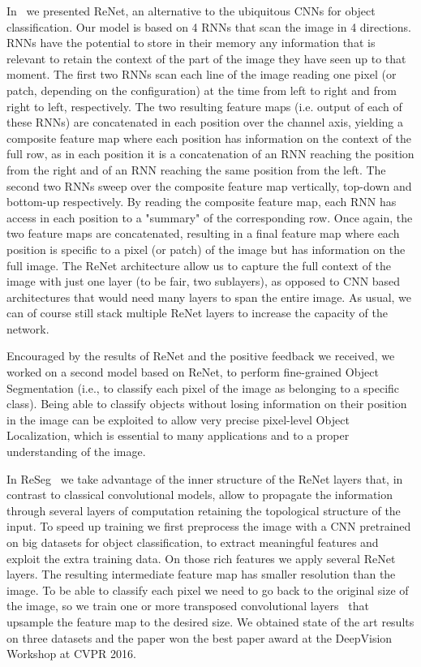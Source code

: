 In~\cite{visin2015renet} we presented ReNet, an alternative to the ubiquitous
CNNs for object classification. Our model is based on 4 RNNs that scan the
image in 4 directions. RNNs have the potential to store in their memory any
information that is relevant to retain the context of the part of the image
they have seen up to that moment. The first two RNNs scan each line of the
image reading one pixel (or patch, depending on the configuration) at the time
from left to right and from right to left, respectively. The two resulting
feature maps (i.e.  output of each of these RNNs) are concatenated in each
position over the channel axis, yielding a composite feature map where each
position has information on the context of the full row, as in each position it
is a concatenation of an RNN reaching the position from the right and of an RNN
reaching the same position from the left. The second two RNNs sweep over the
composite feature map vertically, top-down and bottom-up respectively. By
reading the composite feature map, each RNN has access in each position to a
"summary" of the corresponding row. Once again, the two feature maps are
concatenated, resulting in a final feature map where each position is specific
to a pixel (or patch) of the image but has information on the full image. The
ReNet architecture allow us to capture the full context of the image with just
one layer (to be fair, two sublayers), as opposed to CNN based architectures
that would need many layers to span the entire image. As usual, we can of
course still stack multiple ReNet layers to increase the capacity of the
network.

Encouraged by the results of ReNet and the positive feedback we received, we
worked on a second model based on ReNet, to perform fine-grained Object
Segmentation (i.e., to classify each pixel of the image as belonging to a
specific class). Being able to classify objects without losing information on
their position in the image can be exploited to allow very precise pixel-level
Object Localization, which is essential to many applications and to a proper
understanding of the image.

In ReSeg~\citep{visin15} we take advantage of the inner structure of the ReNet
layers that, in contrast to classical convolutional models, allow to propagate
the information through several layers of computation retaining the topological
structure of the input. To speed up training we first preprocess the image with
a CNN pretrained on big datasets for object classification, to extract
meaningful features and exploit the extra training data. On those rich features
we apply several ReNet layers. The resulting intermediate feature map has
smaller resolution than the image. To be able to classify each pixel we need to
go back to the original size of the image, so we train one or more transposed
convolutional layers~\citep{dumoulin2016guide} that upsample the feature map to
the desired size. We obtained state of the art results on three datasets and
the paper won the best paper award at the DeepVision Workshop at CVPR 2016.

